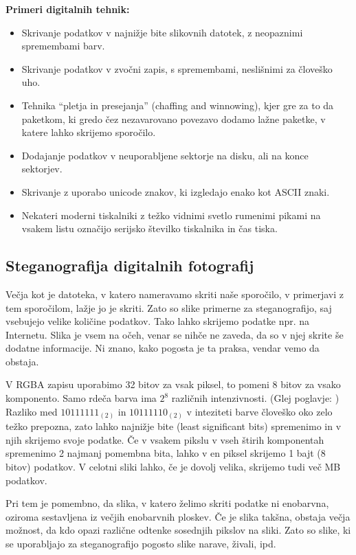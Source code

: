     \textbf{Primeri digitalnih tehnik:}
    \begin{itemize}
        \item Skrivanje podatkov v najnižje bite slikovnih datotek, z neopaznimi spremembami barv.
        \item Skrivanje podatkov v zvočni zapis, s spremembami, neslišnimi za človeško uho.
        \item Tehnika ``pletja in presejanja'' (chaffing and winnowing), kjer gre za to da paketkom, ki gredo čez nezavarovano povezavo dodamo lažne paketke, v katere lahko skrijemo sporočilo.
        \item Dodajanje podatkov v neuporabljene sektorje na disku, ali na konce sektorjev.
        \item Skrivanje z uporabo unicode znakov, ki izgledajo enako kot ASCII znaki.
        \item Nekateri moderni tiskalniki z težko vidnimi svetlo rumenimi pikami na vsakem listu označijo serijsko številko tiskalnika in čas tiska.
        \cite{wikipedia}
    \end{itemize}

\subsection{Steganografija digitalnih fotografij}
    \label{steganografijaslik}
    Večja kot je datoteka, v katero nameravamo skriti naše sporočilo, v primerjavi z tem sporočilom, lažje jo je skriti. Zato so slike primerne za steganografijo, saj vsebujejo velike količine podatkov. Tako lahko skrijemo podatke npr. na Internetu. Slika je vsem na očeh, venar se nihče ne zaveda, da so v njej skrite še dodatne informacije. Ni znano, kako pogosta je ta praksa, vendar vemo da obstaja.

    V RGBA zapisu uporabimo 32 bitov za vsak piksel, to pomeni 8 bitov za vsako komponento. Samo rdeča barva ima $2^8$ različnih intenzivnosti. (Glej poglavje: ) Razliko med $10111111_{(2)}$ in $10111110_{(2)}$ v inteziteti barve človeško oko zelo težko prepozna, zato lahko najnižje bite (least significant bits) spremenimo in v njih skrijemo svoje podatke. Če v vsakem pikslu v vseh štirih komponentah spremenimo 2 najmanj pomembna bita, lahko v en piksel skrijemo 1 bajt (8 bitov) podatkov. V celotni sliki lahko, če je dovolj velika, skrijemo tudi več MB podatkov.

    Pri tem je pomembno, da slika, v katero želimo skriti podatke ni enobarvna, oziroma sestavljena iz večjih enobarvnih ploskev. Če je slika takšna, obstaja večja možnost, da kdo opazi različne odtenke sosednjih pikslov na sliki. Zato so slike, ki se uporabljajo za steganografijo pogosto slike narave, živali, ipd.

